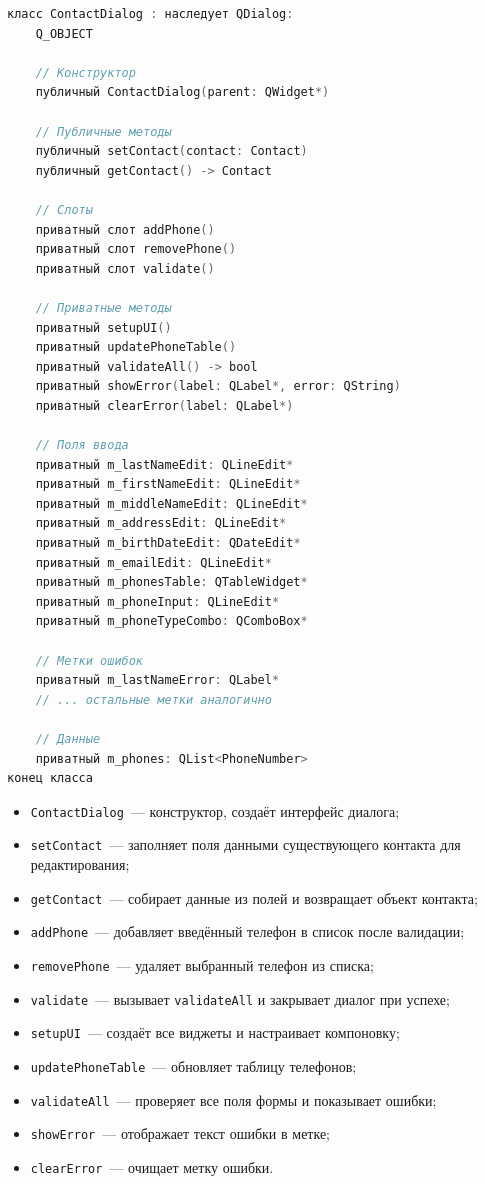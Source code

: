 \begin{lstlisting}[language=C, caption=Заголовочный файл createcontact.h]
класс ContactDialog : наследует QDialog:
    Q_OBJECT
    
    // Конструктор
    публичный ContactDialog(parent: QWidget*)

    // Публичные методы
    публичный setContact(contact: Contact)
    публичный getContact() -> Contact

    // Слоты
    приватный слот addPhone()
    приватный слот removePhone()
    приватный слот validate()

    // Приватные методы
    приватный setupUI()
    приватный updatePhoneTable()
    приватный validateAll() -> bool
    приватный showError(label: QLabel*, error: QString)
    приватный clearError(label: QLabel*)

    // Поля ввода
    приватный m_lastNameEdit: QLineEdit*
    приватный m_firstNameEdit: QLineEdit*
    приватный m_middleNameEdit: QLineEdit*
    приватный m_addressEdit: QLineEdit*
    приватный m_birthDateEdit: QDateEdit*
    приватный m_emailEdit: QLineEdit*
    приватный m_phonesTable: QTableWidget*
    приватный m_phoneInput: QLineEdit*
    приватный m_phoneTypeCombo: QComboBox*
    
    // Метки ошибок
    приватный m_lastNameError: QLabel*
    // ... остальные метки аналогично
    
    // Данные
    приватный m_phones: QList<PhoneNumber>
конец класса
\end{lstlisting}

\begin{itemize}
    \item \texttt{ContactDialog}~--- конструктор, создаёт интерфейс диалога;
    \item \texttt{setContact}~--- заполняет поля данными существующего контакта для редактирования;
    \item \texttt{getContact}~--- собирает данные из полей и возвращает объект контакта;
    \item \texttt{addPhone}~--- добавляет введённый телефон в список после валидации;
    \item \texttt{removePhone}~--- удаляет выбранный телефон из списка;
    \item \texttt{validate}~--- вызывает \texttt{validateAll} и закрывает диалог при успехе;
    \item \texttt{setupUI}~--- создаёт все виджеты и настраивает компоновку;
    \item \texttt{updatePhoneTable}~--- обновляет таблицу телефонов;
    \item \texttt{validateAll}~--- проверяет все поля формы и показывает ошибки;
    \item \texttt{showError}~--- отображает текст ошибки в метке;
    \item \texttt{clearError}~--- очищает метку ошибки.
\end{itemize}

